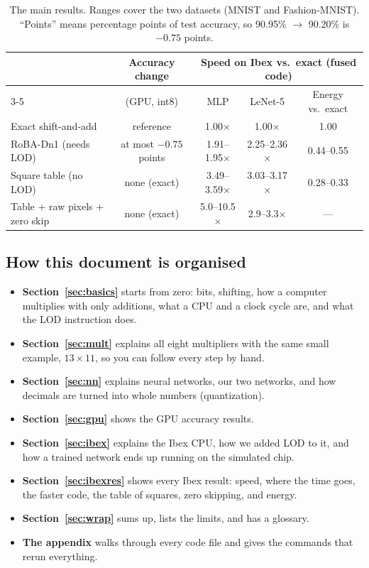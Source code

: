\begin{table}[H]
\centering
\small
\begin{tabular}{lcccc}
\toprule
 & \textbf{Accuracy change} & \multicolumn{3}{c}{\textbf{Speed on Ibex vs.\ exact (fused code)}}\\
\cmidrule(lr){3-5}
 & (GPU, int8) & MLP & LeNet-5 & Energy vs.\ exact\\
\midrule
Exact shift-and-add & reference & 1.00$\times$ & 1.00$\times$ & 1.00\\
RoBA-Dn1 (needs LOD) & at most $-0.75$ points & 1.91--1.95$\times$ & 2.25--2.36$\times$ & 0.44--0.55\\
Square table (no LOD) & none (exact) & 3.49--3.59$\times$ & 3.03--3.17$\times$ & 0.28--0.33\\
Table + raw pixels + zero skip & none (exact) & 5.0--10.5$\times$ & 2.9--3.3$\times$ & ---\\
\bottomrule
\end{tabular}
\caption{The main results. Ranges cover the two datasets (MNIST and Fashion-MNIST). ``Points''
means percentage points of test accuracy, so 90.95\% $\to$ 90.20\% is $-0.75$ points.}
\end{table}

\subsection*{How this document is organised}
\begin{itemize}
  \item \textbf{Section~\ref{sec:basics}} starts from zero: bits, shifting, how a computer
        multiplies with only additions, what a CPU and a clock cycle are, and what the LOD
        instruction does.
  \item \textbf{Section~\ref{sec:mult}} explains all eight multipliers with the same small example,
        $13\times 11$, so you can follow every step by hand.
  \item \textbf{Section~\ref{sec:nn}} explains neural networks, our two networks, and how decimals
        are turned into whole numbers (quantization).
  \item \textbf{Section~\ref{sec:gpu}} shows the GPU accuracy results.
  \item \textbf{Section~\ref{sec:ibex}} explains the Ibex CPU, how we added LOD to it, and how a
        trained network ends up running on the simulated chip.
  \item \textbf{Section~\ref{sec:ibexres}} shows every Ibex result: speed, where the time goes,
        the faster code, the table of squares, zero skipping, and energy.
  \item \textbf{Section~\ref{sec:wrap}} sums up, lists the limits, and has a glossary.
  \item \textbf{The appendix} walks through every code file and gives the commands that rerun
        everything.
\end{itemize}

